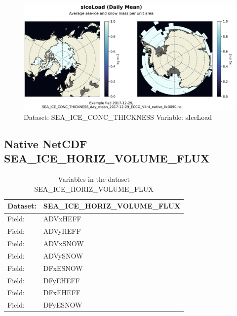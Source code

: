 \begin{figure}[H]
\centering
\includegraphics[width=\textwidth]{../images/plots/native_plots/Sea-Ice_and_Snow_Concentration_and_Thickness/sIceLoad.png}
\caption{Dataset: SEA\_ICE\_CONC\_THICKNESS Variable: sIceLoad}
\label{tab:table-SEA_ICE_CONC_THICKNESS_sIceLoad-Plot}
\end{figure}
\pagebreak
\subsection{Native NetCDF SEA\_ICE\_HORIZ\_VOLUME\_FLUX}
\newp
\begin{longtable}{|p{}|p{}|}
\caption{Variables in the dataset SEA\_ICE\_HORIZ\_VOLUME\_FLUX}
\label{tab:table-SEA_ICE_HORIZ_VOLUME_FLUX-fields} \\ 
\hline \endhead \hline \endfoot
\rowcolor{lightgray} \textbf{Dataset:} & \textbf{SEA\_ICE\_HORIZ\_VOLUME\_FLUX} \\ \hline
Field: &ADVxHEFF \\ \hline
Field: &ADVyHEFF \\ \hline
Field: &ADVxSNOW \\ \hline
Field: &ADVySNOW \\ \hline
Field: &DFxESNOW \\ \hline
Field: &DFyEHEFF \\ \hline
Field: &DFxEHEFF \\ \hline
Field: &DFyESNOW \\ \hline
\end{longtable}

\pagebreak
